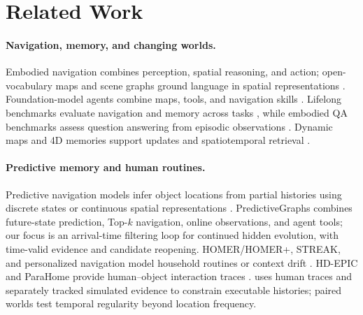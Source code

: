 \section{Related Work}
\label{sec:related_work}

\paragraph{Navigation, memory, and changing worlds.}
Embodied navigation combines perception, spatial reasoning, and action;
open-vocabulary maps and scene graphs ground language in spatial representations
\citep{anderson2018evaluation,savva2019habitat,chaplot2020objectnav,
xin2026agentvln,huang2023vlmaps,gu2024conceptgraphs,werby2024hovsg,
Li_2026_CVPR,huang2026msgnav}. Foundation-model agents combine maps, tools, and
navigation skills
\citep{yokoyama2024vlfm,long2024instructnav,ziliotto2025tango,
li2026agenticnav,zheng2021cos,ginting2024seek,zhang2025apexnav}. Lifelong
benchmarks evaluate navigation and memory across tasks
\citep{khanna2024goatbench,yadav2025findingdory}, while embodied QA benchmarks
assess question answering from episodic observations
\citep{majumdar2024openeqa}. Dynamic maps and 4D memories support updates and
spatiotemporal retrieval
\citep{sohn2025r4,gorlo2026describe,bescos2018dynaslam,
narayana2020lifelong,liu2024dynamem}.

\paragraph{Predictive memory and human routines.}
Predictive navigation models infer object locations from partial histories
using discrete states or continuous spatial representations
\citep{kurenkov2023dynamic,saavedraruiz2026predictivegraphs,
argenziano2026flowmaps}. PredictiveGraphs combines future-state
prediction, Top-$k$ navigation, online observations, and agent tools; our
focus is an arrival-time filtering loop for continued hidden
evolution, with time-valid evidence and candidate reopening. HOMER/HOMER+,
STREAK, and personalized navigation model household routines or context drift
\citep{patel2023homer,patel2023routine,bartoli2025streak,zhang2026ucon}.
HD-EPIC and ParaHome provide human--object interaction traces
\citep{perrett2025hdepic,kim2025parahome}. \evolvingworldbench{} uses human traces and
separately tracked simulated evidence to constrain executable histories; paired
worlds test temporal regularity beyond location frequency.
